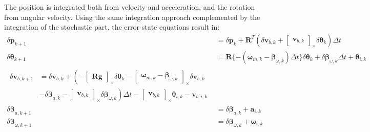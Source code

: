 The position is integrated both from velocity and acceleration, and the rotation from angular velocity. Using the same integration approach complemented by the integration of the stochastic part, the error state equations result in:
\begin{subequations}
\begin{align}
    \delta\mathbf{p}_{k+1}&=\delta\mathbf{p}_{k}+ \mathbf{R}^T\left(\delta \mathbf{v}_{b,k} + \begin{bmatrix} \mathbf{v}_{b,k} \end{bmatrix}_\times \delta\boldsymbol{\theta}_k\right)\Delta t \\
    \delta\boldsymbol{\theta}_{k+1}&=
    \mathbf{R}\{-(\boldsymbol{\omega}_{m,k}-\boldsymbol{\beta}_{\omega,k})\Delta t\}\delta\boldsymbol{\theta}_k +\delta\boldsymbol{\beta}_{\omega,k}\Delta t +\boldsymbol{\theta}_{i,k} \\
    \begin{split}
    \delta \mathbf{v}_{b,k+1}&=\delta \mathbf{v}_{b,k}+\left(-\begin{bmatrix} \mathbf{R}\mathbf{g} \end{bmatrix}_\times\delta\boldsymbol{\theta}_k - \begin{bmatrix}\boldsymbol{\omega}_{m,k}-\boldsymbol{\beta}_{\omega,k} \end{bmatrix}_\times\delta \mathbf{v}_{b,k} \right.\\ & \left. -\delta\boldsymbol{\beta}_{a,k}-\begin{bmatrix}\mathbf{v}_{b,k} \end{bmatrix}_\times \delta\boldsymbol{\beta}_{\omega,k}\right)
    \Delta t -\begin{bmatrix}
        \mathbf{v}_{b,k}
    \end{bmatrix}_\times\boldsymbol{\theta}_{i,k}-\mathbf{v}_{b,i,k}
    \end{split} \\
    \delta\boldsymbol{\beta}_{a,k+1}&=\delta\boldsymbol{\beta}_{a,k}+\mathbf{a}_{i,k} \\
    \delta\boldsymbol{\beta}_{\omega,k+1}&=\delta\boldsymbol{\beta}_{\omega,k}+\boldsymbol{ \omega}_{i,k}
\end{align}
\label{eq:error-eq-discrete}
\end{subequations}

